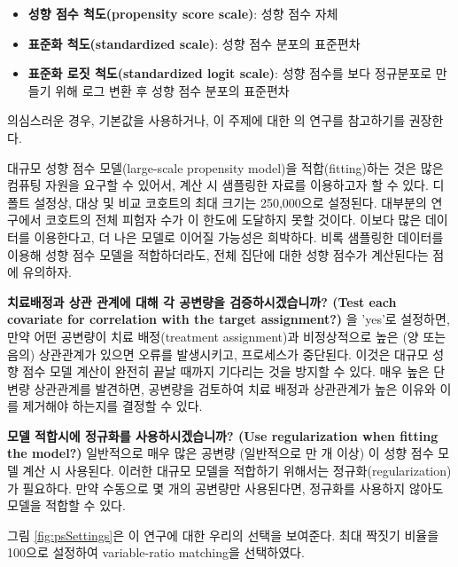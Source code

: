 \documentclass[11pt]{book}
\providecommand{\tightlist}{%
  \setlength{\itemsep}{0pt}\setlength{\parskip}{0pt}}
\theoremstyle{definition}
\theoremstyle{definition}
\theoremstyle{definition}
\theoremstyle{remark}
\begin{document}
\begin{itemize}
\tightlist
\item
  \textbf{성향 점수 척도(propensity score scale)}: 성향 점수 자체
\item
  \textbf{표준화 척도(standardized scale)}: 성향 점수 분포의 표준편차
\item
  \textbf{표준화 로짓 척도(standardized logit scale)}: 성향 점수를 보다
  정규분포로 만들기 위해 로그 변환 후 성향 점수 분포의 표준편차
\end{itemize}

의심스러운 경우, 기본값을 사용하거나, 이 주제에 대한 \citet{austin_2011}
의 연구를 참고하기를 권장한다.

대규모 성향 점수 모델(large-scale propensity model)을 적합(fitting)하는
것은 많은 컴퓨팅 자원을 요구할 수 있어서, 계산 시 샘플링한 자료를
이용하고자 할 수 있다. 디폴트 설정상, 대상 및 비교 코호트의 최대 크기는
250,000으로 설정된다. 대부분의 연구에서 코호트의 전체 피험자 수가 이
한도에 도달하지 못할 것이다. 이보다 많은 데이터를 이용한다고, 더 나은
모델로 이어질 가능성은 희박하다. 비록 샘플링한 데이터를 이용해 성향 점수
모델을 적합하더라도, 전체 집단에 대한 성향 점수가 계산된다는 점에
유의하자.

\textbf{치료배정과 상관 관계에 대해 각 공변량을 검증하시겠습니까? (Test
each covariate for correlation with the target assignment?)} 을 'yes'로
설정하면, 만약 어떤 공변량이 치료 배정(treatment assignment)과
비정상적으로 높은 (양 또는 음의) 상관관계가 있으면 오류를 발생시키고,
프로세스가 중단된다. 이것은 대규모 성향 점수 모델 계산이 완전히 끝날
때까지 기다리는 것을 방지할 수 있다. 매우 높은 단변량 상관관계를
발견하면, 공변량을 검토하여 치료 배정과 상관관계가 높은 이유와 이를
제거해야 하는지를 결정할 수 있다.

\textbf{모델 적합시에 정규화를 사용하시겠습니까? (Use regularization
when fitting the model?)} 일반적으로 매우 많은 공변량 (일반적으로 만 개
이상) 이 성향 점수 모델 계산 시 사용된다. 이러한 대규모 모델을 적합하기
위해서는 정규화(regularization)가 필요하다. 만약 수동으로 몇 개의
공변량만 사용된다면, 정규화를 사용하지 않아도 모델을 적합할 수 있다.

그림 \ref{fig:psSettings}은 이 연구에 대한 우리의 선택을 보여준다. 최대
짝짓기 비율을 100으로 설정하여 variable-ratio matching을 선택하였다.
\end{document}

